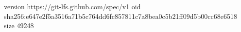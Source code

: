 version https://git-lfs.github.com/spec/v1
oid sha256:e647e2f5a3516a71b5c764dd6fc857811c7a8bea0c5b21ff09d5b00cc68e6518
size 49248
